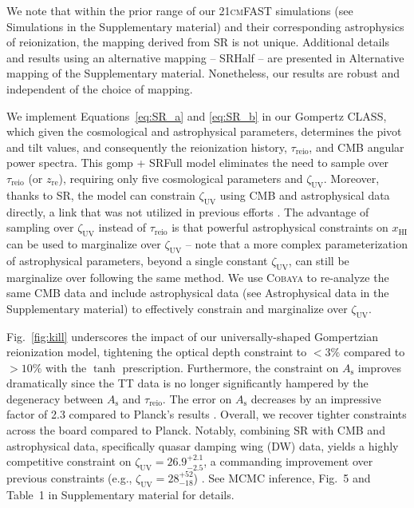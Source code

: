 \documentclass[12pt]{article}
\newcommand{\As}{A_\mathrm{s}}
\newcommand{\zetaUV}{\zeta_\mathrm{UV}}
\newcommand{\HI}{\mathrm{HI}}
\newcommand{\re}{\mathrm{re}}
\newcommand{\reio}{\mathrm{reio}}
\begin{document}
We note that within the prior range of our \textsc{21cmFAST} simulations
(see Simulations in the Supplementary material) and their
corresponding astrophysics of reionization, the mapping derived from SR
is not unique.
Additional details and results using an alternative mapping -- SRHalf --
are presented in Alternative mapping of the Supplementary material.
Nonetheless, our results are robust and independent of the choice of
mapping.

We implement Equations~\eqref{eq:SR_a} and \eqref{eq:SR_b} in our Gompertz \textsc{CLASS},
which given the cosmological and astrophysical parameters, determines
the pivot and tilt values, and consequently the reionization history,
$\tau_\reio$, and CMB angular power spectra.
This gomp + SRFull model eliminates the need to sample over $\tau_\reio$
(or $z_\re$), requiring only five cosmological parameters and $\zetaUV$.
Moreover, thanks to SR, the model can constrain $\zetaUV$ using CMB and
astrophysical data directly, a link that was not utilized in
previous efforts \cite{Greig2017}.
The advantage of sampling over $\zetaUV$ instead of $\tau_\reio$ is that
powerful astrophysical constraints on $x_\HI$ can be used to marginalize
over $\zetaUV$ -- note that a more complex parameterization of 
astrophysical parameters, beyond a single constant $\zetaUV$, can 
still be marginalize over following the same method.
We use \textsc{Cobaya} to re-analyze the same CMB data and include
astrophysical data (see Astrophysical data in the Supplementary material) to
effectively constrain and marginalize over $\zetaUV$.

Fig.~\ref{fig:kill} underscores the impact of our universally-shaped
Gompertzian reionization model, tightening the optical depth constraint to
$<3\%$ compared to $> 10\%$ with the $\tanh$ prescription.
Furthermore, the constraint on $\As$ improves dramatically since the TT
data is no longer significantly hampered by the degeneracy between $\As$
and $\tau_\reio$.
The error on $\As$ decreases by an impressive factor of 2.3 compared to
Planck's results \cite{Planck2020a}.
Overall, we recover tighter constraints across the board compared to
Planck.
Notably, combining SR with CMB and astrophysical data, specifically
quasar damping wing (DW) data, yields a highly competitive constraint on
$\zetaUV = 26.9^{+2.1}_{-2.5}$, a commanding improvement over previous
constraints (e.g., $\zetaUV = 28^{+52}_{-18}$) \cite{Greig2017}.
See MCMC inference, Fig.~5 and Table~1 in
Supplementary material for details.
\end{document}
